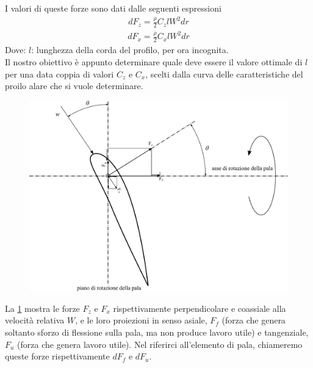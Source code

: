 I valori di queste forze sono dati dalle seguenti espressioni
\begin{align*}
dF_z = \frac{\rho}{2} C_z l W^2 dr
\end{align*}
\begin{align*}
dF_x = \frac{\rho}{2} C_x l W^2 dr
\end{align*}
Dove:
$l$: lunghezza della corda del profilo, per ora incognita.\\[2mm]
Il nostro obiettivo è appunto determinare quale deve essere il valore ottimale di $l$ per una data coppia di valori $C_z$ e $C_x$, scelti dalla curva delle caratteristiche del proilo alare che si vuole determinare. 
\begin{figure}[h!]
\centering
  \includegraphics[width=.7\textwidth]{fig/forzeEol.pdf}
\caption{}
\label{fig:forzeEol}
\end{figure}
La \ref{fig:forzeEol} mostra le forze $F_z$ e $F_x$ rispettivamente perpendicolare e coassiale alla velocità relativa $W$, e le loro proiezioni in senso asiale, $F_f$ (forza che genera soltanto sforzo di flessione sulla pala, ma non produce lavoro utile) e tangenziale, $F_u$ (forza che genera lavoro utile). Nel riferirci all'elemento di pala, chiameremo queste forze rispettivamente $dF_f$ e $dF_u$.

